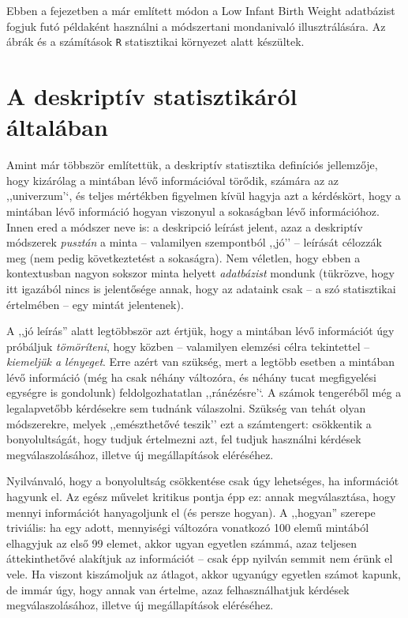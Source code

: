 \documentclass[
]{book}
\begin{document}
Ebben a fejezetben a már említett módon a Low Infant Birth Weight adatbázist fogjuk futó példaként használni a módszertani mondanivaló illusztrálására. Az ábrák és a számítások \texttt{R} statisztikai környezet alatt készültek.

\hypertarget{deskriptivaltalaban}{%
\section{A deskriptív statisztikáról általában}\label{deskriptivaltalaban}}

Amint már többször említettük, a deskriptív statisztika definíciós jellemzője, hogy kizárólag a mintában lévő információval törődik, számára az az ,,univerzum'`, és teljes mértékben figyelmen kívül hagyja azt a kérdéskört, hogy a mintában lévő információ hogyan viszonyul a sokaságban lévő információhoz. Innen ered a módszer neve is: a deskripció leírást jelent, azaz a deskriptív módszerek \emph{pusztán} a minta -- valamilyen szempontból ,,jó'' -- leírását célozzák meg (nem pedig következtetést a sokaságra). Nem véletlen, hogy ebben a kontextusban nagyon sokszor minta helyett \emph{adatbázist} mondunk (tükrözve, hogy itt igazából nincs is jelentősége annak, hogy az adataink csak -- a szó statisztikai értelmében -- egy mintát jelentenek).

A ,,jó leírás'' alatt legtöbbször azt értjük, hogy a mintában lévő információt úgy próbáljuk \emph{tömöríteni}, hogy közben -- valamilyen elemzési célra tekintettel -- \emph{kiemeljük a lényeget}. Erre azért van szükség, mert a legtöbb esetben a mintában lévő információ (még ha csak néhány változóra, és néhány tucat megfigyelési egységre is gondolunk) feldolgozhatatlan ,,ránézésre'`. A számok tengeréből még a legalapvetőbb kérdésekre sem tudnánk válaszolni. Szükség van tehát olyan módszerekre, melyek ,,emészthetővé teszik'' ezt a számtengert: csökkentik a bonyolultságát, hogy tudjuk értelmezni azt, fel tudjuk használni kérdések megválaszolásához, illetve új megállapítások eléréséhez.

Nyilvánvaló, hogy a bonyolultság csökkentése csak úgy lehetséges, ha információt hagyunk el. Az egész művelet kritikus pontja épp ez: annak megválasztása, hogy mennyi információt hanyagoljunk el (és persze hogyan). A ,,hogyan'' szerepe triviális: ha egy adott, mennyiségi változóra vonatkozó 100 elemű mintából elhagyjuk az első 99 elemet, akkor ugyan egyetlen számmá, azaz teljesen áttekinthetővé alakítjuk az információt -- csak épp nyilván semmit nem érünk el vele. Ha viszont kiszámoljuk az átlagot, akkor ugyanúgy egyetlen számot kapunk, de immár úgy, hogy annak van értelme, azaz felhasználhatjuk kérdések megválaszolásához, illetve új megállapítások eléréséhez.
\end{document}
